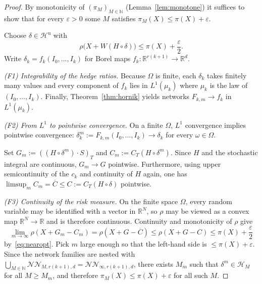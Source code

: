 \documentclass[11pt,a4paper]{report}
\numberwithin{equation}{chapter}
\theoremstyle{plain}
\theoremstyle{definition}
\newcommand{\R}{\mathbb{R}}
\newcommand{\N}{\mathbb{N}}
\newcommand{\HH}{\mathcal{H}}
\newcommand{\Hu}{\mathcal{H}^{\mathrm{u}}}
\newcommand{\NNet}{\mathcal{N\!N}}
\begin{document}
\begin{proof}
  By monotonicity of $(\pi_M)_{M\in\N}$ (Lemma~\ref{lem:monotone}) it
  suffices to show that for every $\varepsilon>0$ some $M$ satisfies
  $\pi_M(X)\le\pi(X)+\varepsilon$.

  Choose $\delta\in\Hu$ with
  \begin{equation}\label{eq:nearopt}
    \rho\bigl(X+W(H\circ\delta)\bigr)\le\pi(X)+\frac{\varepsilon}{2}.
  \end{equation}
  Write $\delta_k=f_k(I_0,\dots,I_k)$ for Borel maps
  $f_k:\R^{r(k+1)}\to\R^d$.

  \indent\textit{(F1) Integrability of the hedge ratios.}
  Because $\Omega$ is finite, each $\delta_k$ takes finitely many values
  and every component of $f_k$ lies in $L^1(\mu_k)$ where $\mu_k$ is the
  law of $(I_0,\dots,I_k)$. Finally, Theorem~\ref{thm:hornik} yields
  networks $F_{k,m}\to f_k$ in $L^1(\mu_k)$.

  \indent\textit{(F2) From $L^1$ to pointwise convergence.}
  On a finite $\Omega$, $L^1$ convergence implies pointwise convergence:
  $\delta^m_k:=F_{k,m}(I_0,\dots,I_k)\to\delta_k$ for every
  $\omega\in\Omega$.

  \indent Set $G_m:=((H\circ\delta^m)\cdot S)_T$ and
  $C_m:=C_T(H\circ\delta^m)$. Since $H$ and the stochastic integral are
  continuous, $G_m\to G$ pointwise. Furthermore, using upper
  semicontinuity of the $c_k$ and continuity of $H$ again, one has
  $\limsup_m C_m=\overline C\le C:=C_T(H\circ\delta)$ pointwise.

  \indent\textit{(F3) Continuity of the risk measure.}
  On the finite space $\Omega$, every random variable may be identified
  with a vector in $\R^N$, so $\rho$ may be viewed as a convex map
  $\R^N\to\R$ and is therefore continuous. Continuity and
  monotonicity of $\rho$ give
  \[
    \lim_{m\to\infty}\rho(X+G_m-C_m)=\rho(X+G-\overline C)
    \le\rho(X+G-C)\le\pi(X)+\frac{\varepsilon}{2}
  \]
  by~\eqref{eq:nearopt}. Pick $m$ large enough so that the
  left-hand side is $\le\pi(X)+\varepsilon$. Since the network families
  are nested with
  $\bigcup_{M\in\N}\NNet_{M,r(k+1),d}=\NNet_{\infty,r(k+1),d}$, there
  exists $M_m$ such that $\delta^m\in\HH_M$ for all $M\ge M_m$, and
  therefore $\pi_M(X)\le\pi(X)+\varepsilon$ for all such $M$.
\end{proof}
\end{document}
